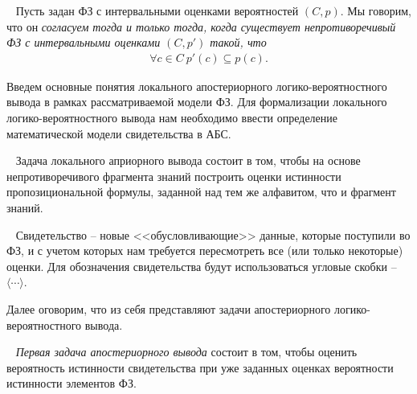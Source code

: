             \begin{Def}
            ~\cite{AVS_2011}
                Пусть задан ФЗ с интервальными оценками вероятностей \begin{math}(C,p)\end{math}. Мы говорим, что он \it{согласуем} тогда и только тогда, когда существует непротиворечивый ФЗ с интервальными оценками \begin{math}(C,p')\end{math} такой, что 
                \begin{eqnarray*}
                    \forall c\in C \:  p'(c) \subseteq p(c).
                \end{eqnarray*}
            \end{Def}
            
            
            Введем основные понятия локального апостериорного логико-ве\-роят\-ност\-но\-го вывода в рамках рассматриваемой модели ФЗ. Для формализации локального логико-вероятностного вывода нам необходимо ввести определение математической модели свидетельства в АБС.

            \begin{Def}
            ~\cite{AVS_2011}
                Задача локального априорного вывода состоит в том, чтобы на основе непротиворечивого фрагмента знаний построить оценки истинности пропозициональной формулы, заданной над тем же алфавитом, что и фрагмент знаний.
            \end{Def}


            \begin{Def}
            ~\cite{AVS_2011}
                Свидетельство -- новые <<обусловливающие>> данные, которые поступили во ФЗ, и с учетом которых нам требуется пересмотреть все (или только некоторые) оценки. Для обозначения свидетельства будут использоваться угловые скобки -- $\langle \cdots \rangle$.
            \end{Def}
            
            Далее оговорим, что из себя представляют задачи апостериорного логико-вероятностного вывода.
            

            \begin{Def}
            ~\cite{AVS_2011}
                {\it Первая задача апостериорного вывода} состоит в том, чтобы оценить вероятность истинности свидетельства при уже заданных оценках вероятности истинности элементов ФЗ.
            \end{Def}
            
